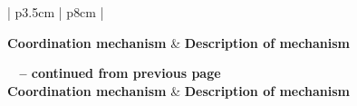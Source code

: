 \begin{center}
    \begin{longtable}{| p{3.5cm} | p{8cm} |}

    \hline \textbf{Coordination mechanism} & \textbf{Description of mechanism} \\ \hline
    \endfirsthead

{{\bfseries \tablename\ \thetable{} -- continued from previous page}} \\ \hline
    \textbf{Coordination mechanism} & \textbf{Description of mechanism} \\ \hline
    \endhead

     \\ \hline
    \endfoot

   \endlastfoot


\end{longtable}
\end{center}
